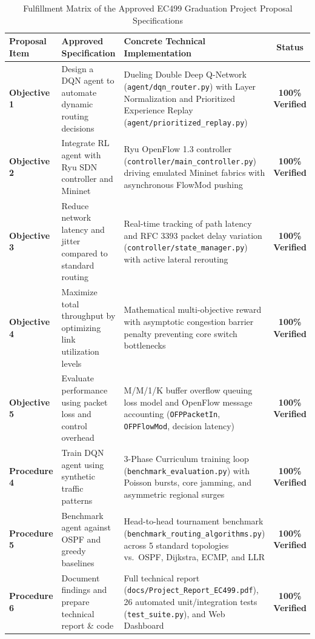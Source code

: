 \documentclass[10pt,twocolumn,a4paper]{article}
\begin{document}
\begin{table}[t]
\centering
\small
\caption{Fulfillment Matrix of the Approved EC499 Graduation Project Proposal Specifications}
\label{tab:proposal_matrix}
\begin{tabularx}{\textwidth}{l p{5.2cm} X c}
\toprule
\textbf{Proposal Item} & \textbf{Approved Specification} & \textbf{Concrete Technical Implementation} & \textbf{Status} \\
\midrule
\textbf{Objective 1} & Design a DQN agent to automate dynamic routing decisions & Dueling Double Deep Q-Network (\texttt{agent/dqn\_router.py}) with Layer Normalization and Prioritized Experience Replay (\texttt{agent/prioritized\_replay.py}) & \textbf{100\% Verified} \\
\textbf{Objective 2} & Integrate RL agent with Ryu SDN controller and Mininet & Ryu OpenFlow 1.3 controller (\texttt{controller/main\_controller.py}) driving emulated Mininet fabrics with asynchronous FlowMod pushing & \textbf{100\% Verified} \\
\textbf{Objective 3} & Reduce network latency and jitter compared to standard routing & Real-time tracking of path latency and RFC 3393 packet delay variation (\texttt{controller/state\_manager.py}) with active lateral rerouting & \textbf{100\% Verified} \\
\textbf{Objective 4} & Maximize total throughput by optimizing link utilization levels & Mathematical multi-objective reward with asymptotic congestion barrier penalty preventing core switch bottlenecks & \textbf{100\% Verified} \\
\textbf{Objective 5} & Evaluate performance using packet loss and control overhead & M/M/1/K buffer overflow queuing loss model and OpenFlow message accounting (\texttt{OFPPacketIn}, \texttt{OFPFlowMod}, decision latency) & \textbf{100\% Verified} \\
\textbf{Procedure 4} & Train DQN agent using synthetic traffic patterns & 3-Phase Curriculum training loop (\texttt{benchmark\_evaluation.py}) with Poisson bursts, core jamming, and asymmetric regional surges & \textbf{100\% Verified} \\
\textbf{Procedure 5} & Benchmark agent against OSPF and greedy baselines & Head-to-head tournament benchmark (\texttt{benchmark\_routing\_algorithms.py}) across 5 standard topologies vs.\ OSPF, Dijkstra, ECMP, and LLR & \textbf{100\% Verified} \\
\textbf{Procedure 6} & Document findings and prepare technical report \& code & Full technical report (\texttt{docs/Project\_Report\_EC499.pdf}), 26 automated unit/integration tests (\texttt{test\_suite.py}), and Web Dashboard & \textbf{100\% Verified} \\
\bottomrule
\end{tabularx}
\end{table}
\end{document}
